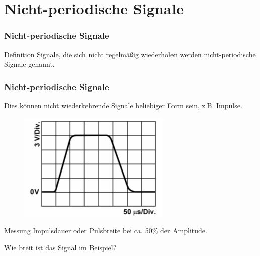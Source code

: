 \section{Nicht-periodische Signale}

\begin{frame}
  \frametitle{Nicht-periodische Signale}

  \begin{block}{Definition}
    Signale, die sich nicht regelmäßig wiederholen werden nicht-periodische Signale genannt.
  \end{block}

\end{frame}

\begin{frame}
  \frametitle{Nicht-periodische Signale}

  Dies können nicht wiederkehrende Signale beliebiger Form sein, z.B. Impulse.

  \begin{center}
    \begin{figure}
      \includegraphics[width=\textwidth,height=0.5\textheight,keepaspectratio]{a11/TB702a.png}
    \end{figure}
  \end{center}

  Messung Impulsdauer oder Pulsbreite bei ca. 50\% der Amplitude.

  Wie breit ist das Signal im Beispiel? 

\end{frame}

